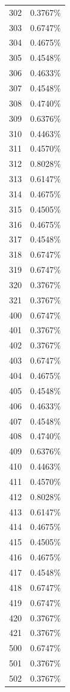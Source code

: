 \documentclass[
  14pt,
]{book}
\begin{document}
\begin{longtable}[]{@{}ll@{}}
302 & 0.3767\% \\
303 & 0.6747\% \\
304 & 0.4675\% \\
305 & 0.4548\% \\
306 & 0.4633\% \\
307 & 0.4548\% \\
308 & 0.4740\% \\
309 & 0.6376\% \\
310 & 0.4463\% \\
311 & 0.4570\% \\
312 & 0.8028\% \\
313 & 0.6147\% \\
314 & 0.4675\% \\
315 & 0.4505\% \\
316 & 0.4675\% \\
317 & 0.4548\% \\
318 & 0.6747\% \\
319 & 0.6747\% \\
320 & 0.3767\% \\
321 & 0.3767\% \\
400 & 0.6747\% \\
401 & 0.3767\% \\
402 & 0.3767\% \\
403 & 0.6747\% \\
404 & 0.4675\% \\
405 & 0.4548\% \\
406 & 0.4633\% \\
407 & 0.4548\% \\
408 & 0.4740\% \\
409 & 0.6376\% \\
410 & 0.4463\% \\
411 & 0.4570\% \\
412 & 0.8028\% \\
413 & 0.6147\% \\
414 & 0.4675\% \\
415 & 0.4505\% \\
416 & 0.4675\% \\
417 & 0.4548\% \\
418 & 0.6747\% \\
419 & 0.6747\% \\
420 & 0.3767\% \\
421 & 0.3767\% \\
500 & 0.6747\% \\
501 & 0.3767\% \\
502 & 0.3767\% \\

\end{longtable}
\end{document}
